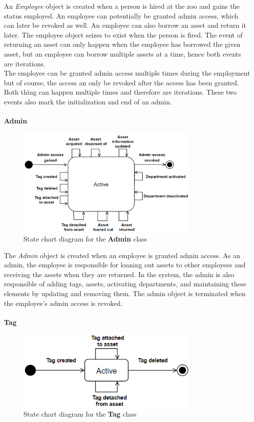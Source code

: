 An \textit{Employee} object is created when a person is hired at the zoo and gains the status employed. An employee can potentially be granted admin access, which can later be revoked as well. An employee can also borrow an asset and return it later. The employee object seizes to exist when the person is fired. The event of returning an asset can only happen when the employee has borrowed the given asset, but an employee can borrow multiple assets at a time, hence both events are iterations.\\
The employee can be granted admin access multiple times during the employment but of course, the access an only be revoked after the access has been granted. Both thing can happen multiple times and therefore are iterations. These two events also mark the initialization and end of an admin.
\\\\

\large{\textbf{Admin}}
\begin{figure}[H]
    \centering
    \includegraphics[width=0.8\textwidth]{figures/StateCharts/Admin_state_chart.png}
    \caption{State chart diagram for the \textbf{Admin} class}
    \label{fig:admin_statechart}
\end{figure}

The \textit{Admin} object is created when an employee is granted admin access. As an admin, the employee is responsible for loaning out assets to other employees and receiving the assets when they are returned. In the system, the admin is also responsible of adding tags, assets, activating departments, and maintaining these elements by updating and removing them. The admin object is terminated when the employee's admin access is revoked.
\\\\

\large{\textbf{Tag}}
\begin{figure}[H]
    \centering
    \includegraphics[width=0.8\textwidth]{figures/StateCharts/Tag_state_chart.png}
    \caption{State chart diagram for the \textbf{Tag} class}
    \label{fig:loan_statechart}
\end{figure}


